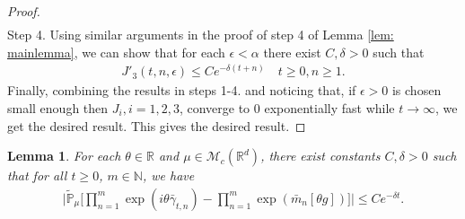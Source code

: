 \documentclass[12pt,a4paper]{amsart}
\theoremstyle{plain}
\newtheorem{lem}[thm]{Lemma}
\theoremstyle{definition}
\numberwithin{equation}{section}
\begin{document}
\begin{proof}
\begin{align}
\end{align}
	Step 4. Using similar arguments in the proof of step 4 of Lemma \ref{lem: mainlemma}, we can show that for each $\epsilon< \alpha$ there exist $C,\delta>0$ such that
\begin{align}\label{ineq: control of J31}
    J'_3(t,n,\epsilon)\leq Ce^{-\delta (t+n)}\quad t\geq0, n\geq 1.
\end{align}
Finally, combining the results in steps 1-4. and noticing that, if $\epsilon>0$ is chosen small enough then $J_{i}, i = 1,2,3$, converge to $0$ exponentially fast while $t\rightarrow\infty$, we get the desired result.
	This gives the desired result.
\end{proof}

\begin{lem}\label{lem:lemma03}
    For each $\theta\in \mathbb{R}$ and $\mu \in \mathcal{M}_c(\mathbb{R}^d)$, there exist constants $C,\delta>0$ such that for all $t\geq 0$, $m\in\mathbb{N}$, we have
    \begin{align}\label{ineq: next we will need}
        \Big|\tilde{\mathbb{P}}_{\mu}\Big[\prod_{n=1}^m\exp(i\theta\bar{\gamma}_{t,n})-\prod_{n=1}^m\exp(\bar{m}_n[\theta g])\Big]\Big|\leq C e^{-\delta t}.
    \end{align}
\end{lem}
\end{document}
